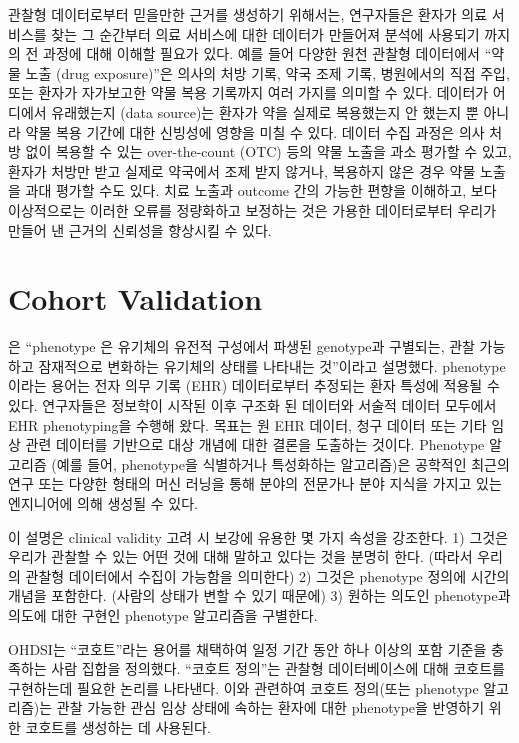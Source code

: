 \documentclass[11pt]{book}
\theoremstyle{definition}
\theoremstyle{definition}
\theoremstyle{definition}
\theoremstyle{remark}
\begin{document}
관찰형 데이터로부터 믿을만한 근거를 생성하기 위해서는, 연구자들은 환자가
의료 서비스를 찾는 그 순간부터 의료 서비스에 대한 데이터가 만들어져
분석에 사용되기 까지의 전 과정에 대해 이해할 필요가 있다. 예를 들어
다양한 원천 관찰형 데이터에서 ``약물 노출 (drug exposure)''은 의사의
처방 기록, 약국 조제 기록, 병원에서의 직접 주입, 또는 환자가 자가보고한
약물 복용 기록까지 여러 가지를 의미할 수 있다. 데이터가 어디에서
유래했는지 (data source)는 환자가 약을 실제로 복용했는지 안 했는지 뿐
아니라 약물 복용 기간에 대한 신빙성에 영향을 미칠 수 있다. 데이터 수집
과정은 의사 처방 없이 복용할 수 있는 over-the-count (OTC) 등의 약물
노출을 과소 평가할 수 있고, 환자가 처방만 받고 실제로 약국에서 조제 받지
않거나, 복용하지 않은 경우 약물 노출을 과대 평가할 수도 있다. 치료
노출과 outcome 간의 가능한 편향을 이해하고, 보다 이상적으로는 이러한
오류를 정량화하고 보정하는 것은 가용한 데이터로부터 우리가 만들어 낸
근거의 신뢰성을 향상시킬 수 있다.

\section{Cohort Validation}\label{CohortValidation}

\citet{hripcsak_2017} 은 ``phenotype 은 유기체의 유전적 구성에서 파생된
genotype과 구별되는, 관찰 가능하고 잠재적으로 변화하는 유기체의 상태를
나타내는 것''이라고 설명했다. phenotype 이라는 용어는 전자 의무 기록
(EHR) 데이터로부터 추정되는 환자 특성에 적용될 수있다. 연구자들은
정보학이 시작된 이후 구조화 된 데이터와 서술적 데이터 모두에서 EHR
phenotyping을 수행해 왔다. 목표는 원 EHR 데이터, 청구 데이터 또는 기타
임상 관련 데이터를 기반으로 대상 개념에 대한 결론을 도출하는 것이다.
Phenotype 알고리즘 (예를 들어, phenotype을 식별하거나 특성화하는
알고리즘)은 공학적인 최근의 연구 또는 다양한 형태의 머신 러닝을 통해
분야의 전문가나 분야 지식을 가지고 있는 엔지니어에 의해 생성될 수 있다.

이 설명은 clinical validity 고려 시 보강에 유용한 몇 가지 속성을
강조한다. 1) 그것은 우리가 관찰할 수 있는 어떤 것에 대해 말하고 있다는
것을 분명히 한다. (따라서 우리의 관찰형 데이터에서 수집이 가능함을
의미한다) 2) 그것은 phenotype 정의에 시간의 개념을 포함한다. (사람의
상태가 변할 수 있기 때문에) 3) 원하는 의도인 phenotype과 의도에 대한
구현인 phenotype 알고리즘을 구별한다.

OHDSI는 ``코호트''라는 용어를 채택하여 일정 기간 동안 하나 이상의 포함
기준을 충족하는 사람 집합을 정의했다. ``코호트 정의''는 관찰형
데이터베이스에 대해 코호트를 구현하는데 필요한 논리를 나타낸다. 이와
관련하여 코호트 정의(또는 phenotype 알고리즘)는 관찰 가능한 관심 임상
상태에 속하는 환자에 대한 phenotype을 반영하기 위한 코호트를 생성하는 데
사용된다.
\end{document}
